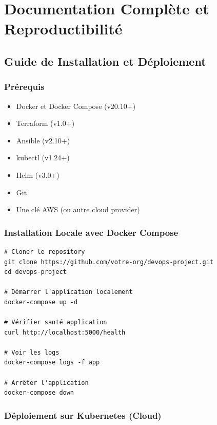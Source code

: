 \documentclass[12pt,a4paper]{report}
\begin{document}
\newpage

\chapter{Documentation Complète et Reproductibilité}

\section{Guide de Installation et Déploiement}

\subsection{Prérequis}

\begin{itemize}
    \item Docker et Docker Compose (v20.10+)
    \item Terraform (v1.0+)
    \item Ansible (v2.10+)
    \item kubectl (v1.24+)
    \item Helm (v3.0+)
    \item Git
    \item Une clé AWS (ou autre cloud provider)
\end{itemize}

\subsection{Installation Locale avec Docker Compose}

\lstset{language=bash}
\begin{lstlisting}
# Cloner le repository
git clone https://github.com/votre-org/devops-project.git
cd devops-project

# Démarrer l'application localement
docker-compose up -d

# Vérifier santé application
curl http://localhost:5000/health

# Voir les logs
docker-compose logs -f app

# Arrêter l'application
docker-compose down
\end{lstlisting}

\subsection{Déploiement sur Kubernetes (Cloud)}
\end{document}
